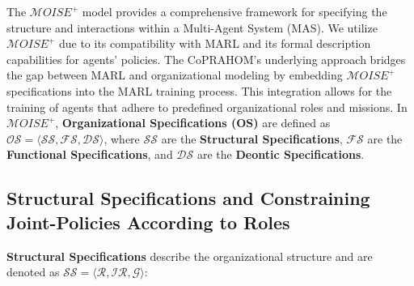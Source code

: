 \documentclass[conference]{IEEEtran}
\begin{document}
The $\mathcal{M}OISE^+$ model provides a comprehensive framework for specifying the structure and interactions within a Multi-Agent System (MAS). We utilize $\mathcal{M}OISE^+$ due to its compatibility with MARL and its formal description capabilities for agents' policies. The CoPRAHOM's underlying approach bridges the gap between MARL and organizational modeling by embedding $\mathcal{M}OISE^+$ specifications into the MARL training process. This integration allows for the training of agents that adhere to predefined organizational roles and missions.
%
In $\mathcal{M}OISE^+$, \textbf{Organizational Specifications (OS)} are defined as $\mathcal{OS} = \langle \mathcal{SS}, \mathcal{FS}, \mathcal{DS} \rangle$, where $\mathcal{SS}$ are the \textbf{Structural Specifications}, $\mathcal{FS}$ are the \textbf{Functional Specifications}, and $\mathcal{DS}$ are the \textbf{Deontic Specifications}.

\subsection{Structural Specifications and Constraining Joint-Policies According to Roles}

\textbf{Structural Specifications} describe the organizational structure and are denoted as $\mathcal{SS} = \langle \mathcal{R}, \mathcal{IR}, \mathcal{G} \rangle$:
\end{document}
